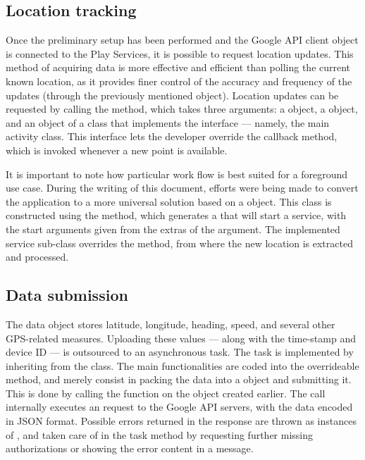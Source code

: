 \subsection{Location tracking}
Once the preliminary setup has been performed and the Google API client object is connected to the Play Services, it is possible to request location updates.
This method of acquiring data is more effective and efficient than polling the current known location, as it provides finer control of the accuracy and frequency of the updates (through the previously mentioned  object).
Location updates can be requested by calling the  method, which takes three arguments: a  object, a  object, and an object of a class that implements the  interface --- namely, the main activity class.
This interface lets the developer override the  callback method, which is invoked whenever a new point is available.

It is important to note how  particular work flow is best suited for a foreground use case.
During the writing of this document, efforts were being made to convert the application to a more universal solution based on a  object.
This class is constructed using the  method, which generates a  that will start a service, with the start arguments given from the extras of the  argument.
The implemented service sub-class overrides the  method, from where the new location is extracted and processed.


\subsection{Data submission}
The  data object stores latitude, longitude, heading, speed, and several other GPS-related measures.
Uploading these values --- along with the time-stamp and device ID --- is outsourced to an asynchronous task.
The task is implemented by inheriting from the  class.
The main functionalities are coded into the overrideable  method, and merely consist in packing the data into a  object and submitting it.
This is done by calling the  function on the  object created earlier.
The call internally executes an  request to the Google API servers, with the data encoded in JSON format.
Possible errors returned in the response are thrown as instances of , and taken care of in the task  method by requesting further missing authorizations or showing the error content in a message.


